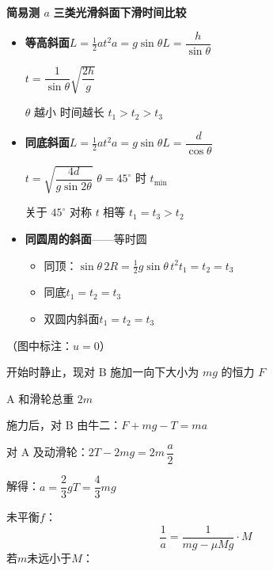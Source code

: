 \textbf{简易测 $a$}
\textbf{三类光滑斜面下滑时间比较}
\begin{itemize}
\item \textbf{等高斜面}\quad $L=\frac12at^2$\quad $a=g\sin\theta$\quad $L=\dfrac{h}{\sin\theta}$

$t=\dfrac{1}{\sin\theta}\sqrt{\dfrac{2h}{g}}$

$\theta$ 越小 时间越长
$t_1>t_2>t_3$
\item \textbf{同底斜面}\quad $L=\frac12at^2$\quad $a=g\sin\theta$\quad $L=\dfrac{d}{\cos\theta}$

$t=\sqrt{\dfrac{4d}{g\sin2\theta}}$
$\theta=45^\circ$ 时 $t_{\min}$

关于 $45^\circ$ 对称 $t$ 相等
$t_1=t_3>t_2$
\item \textbf{同圆周的斜面}——等时圆
\begin{itemize}
\item 同顶：$\sin\theta\,2R=\frac12g\sin\theta\,t^2$\quad $t_1=t_2=t_3$
\item 同底\quad $t_1=t_2=t_3$
\item 双圆内斜面\quad $t_1=t_2=t_3$
\end{itemize}
\end{itemize}
\begin{problem}
（图中标注：$u=0$） %

开始时静止，现对 B 施加一向下大小为 $mg$ 的恒力 $F$

A 和滑轮总重 $2m$
\begin{solution}
施力后，对 B 由牛二：$F+mg-T=ma$

对 A 及动滑轮：$2T-2mg=2m\,\dfrac{a}{2}$

解得：$a=\dfrac23g$\qquad $T=\dfrac43mg$
\end{solution}
\end{problem}
未平衡$f$：
\[
\frac{1}{a}=\frac{1}{mg-\mu Mg}\cdot M
\]
若$m$未远小于$M$：

